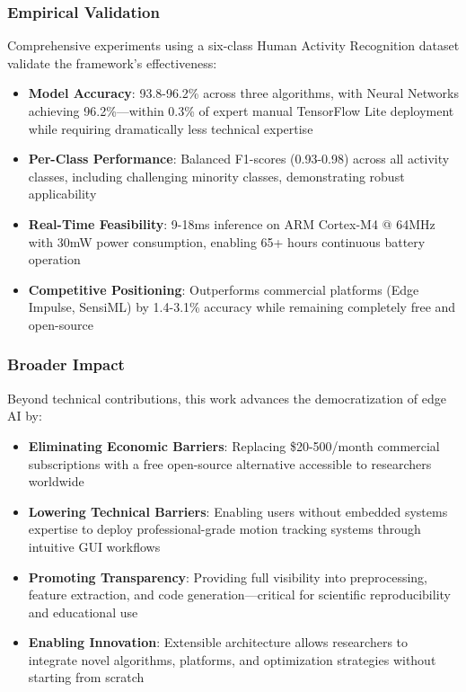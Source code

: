 \subsubsection{Empirical Validation}
Comprehensive experiments using a six-class Human Activity Recognition dataset validate the framework's effectiveness:
\begin{itemize}
    \item \textbf{Model Accuracy}: 93.8-96.2\% across three algorithms, with Neural Networks achieving 96.2\%—within 0.3\% of expert manual TensorFlow Lite deployment while requiring dramatically less technical expertise
    \item \textbf{Per-Class Performance}: Balanced F1-scores (0.93-0.98) across all activity classes, including challenging minority classes, demonstrating robust applicability
    \item \textbf{Real-Time Feasibility}: 9-18ms inference on ARM Cortex-M4 @ 64MHz with 30mW power consumption, enabling 65+ hours continuous battery operation
    \item \textbf{Competitive Positioning}: Outperforms commercial platforms (Edge Impulse, SensiML) by 1.4-3.1\% accuracy while remaining completely free and open-source
\end{itemize}

\subsubsection{Broader Impact}
Beyond technical contributions, this work advances the democratization of edge AI by:
\begin{itemize}
    \item \textbf{Eliminating Economic Barriers}: Replacing \$20-500/month commercial subscriptions with a free open-source alternative accessible to researchers worldwide
    \item \textbf{Lowering Technical Barriers}: Enabling users without embedded systems expertise to deploy professional-grade motion tracking systems through intuitive GUI workflows
    \item \textbf{Promoting Transparency}: Providing full visibility into preprocessing, feature extraction, and code generation—critical for scientific reproducibility and educational use
    \item \textbf{Enabling Innovation}: Extensible architecture allows researchers to integrate novel algorithms, platforms, and optimization strategies without starting from scratch
\end{itemize}

